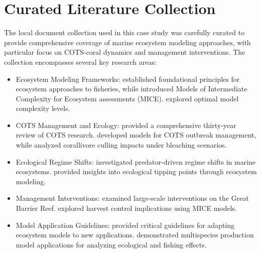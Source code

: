 \setcounter{section}{0}
\renewcommand{\thesection}{S\arabic{section}}

\section{Curated Literature Collection}
\label{subsec:curated_literature}

The local document collection used in this case study was carefully curated to provide comprehensive coverage of marine ecosystem modeling approaches, with particular focus on COTS-coral dynamics and management interventions. The collection encompasses several key research areas:

\begin{itemize}
\item Ecosystem Modeling Frameworks: \cite{Plaganyi_2007} established foundational principles for ecosystem approaches to fisheries, while \cite{Plaganyi_Punt_Hillary_Morello_Thebaud_Hutton_Pillans_Thorson_Fulton_Smith_et_al_2014} introduced Models of Intermediate Complexity for Ecosystem assessments (MICE). \cite{Collie_Botsford_Hastings_Kaplan_Largier_Livingston_Plaganyi_Rose_Wells_Werner_2016} explored optimal model complexity levels.

\item COTS Management and Ecology: \cite{Pratchett_Caballes_Wilmes_Matthews_Mellin_Sweatman_Nadler_Brodie_Thompson_Hoey_et_al_2017} provided a comprehensive thirty-year review of COTS research. \cite{morello2014model} developed models for COTS outbreak management, while \cite{Rogers_Plaganyi_2022} analyzed corallivore culling impacts under bleaching scenarios.

\item Ecological Regime Shifts: \cite{Blamey_Plaganyi_Branch_2014} investigated predator-driven regime shifts in marine ecosystems. \cite{Plaganyi_Ellis_Blamey_Morello_Norman-Lopez_Robinson_Sporcic_Sweatman_2014} provided insights into ecological tipping points through ecosystem modeling.

\item Management Interventions: \cite{Condie_Anthony_Babcock_Baird_Beeden_Fletcher_Gorton_Harrison_Hobday_Plaganyi_et_al_2021} examined large-scale interventions on the Great Barrier Reef. \cite{Punt_MacCall_Essington_Francis_Hurtado-Ferro_Johnson_Kaplan_Koehn_Levin_Sydeman_2016} explored harvest control implications using MICE models.

\item Model Application Guidelines: \cite{Essington_Plaganyi_2014} provided critical guidelines for adapting ecosystem models to new applications. \cite{Gamble_Link_2009} demonstrated multispecies production model applications for analyzing ecological and fishing effects.


\end{itemize}
